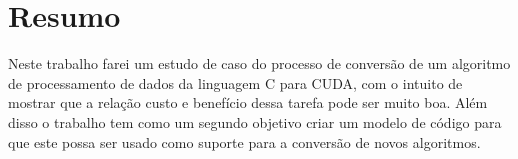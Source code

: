 \chapter*{Resumo}

Neste trabalho farei um estudo de caso do processo de conversão de um algoritmo de processamento de dados da linguagem C para CUDA, com o intuito de mostrar que a relação custo e benefício dessa tarefa pode ser muito boa. Além disso o trabalho tem como um segundo objetivo criar um modelo de código para que este possa ser usado como suporte para a conversão de novos algoritmos.